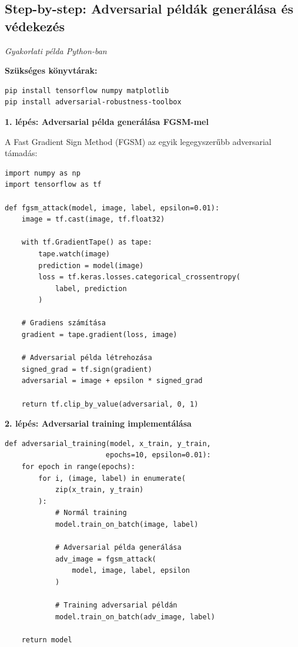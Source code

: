 \documentclass{../templates/magazine}
\begin{document}
\subsection{Step-by-step: Adversarial példák generálása és védekezés}

\textit{Gyakorlati példa Python-ban}

\textbf{Szükséges könyvtárak:}
\begin{verbatim}
pip install tensorflow numpy matplotlib
pip install adversarial-robustness-toolbox
\end{verbatim}

\textbf{1. lépés: Adversarial példa generálása FGSM-mel}

A Fast Gradient Sign Method (FGSM) az egyik legegyszerűbb adversarial támadás:

\begin{verbatim}
import numpy as np
import tensorflow as tf

def fgsm_attack(model, image, label, epsilon=0.01):
    image = tf.cast(image, tf.float32)

    with tf.GradientTape() as tape:
        tape.watch(image)
        prediction = model(image)
        loss = tf.keras.losses.categorical_crossentropy(
            label, prediction
        )

    # Gradiens számítása
    gradient = tape.gradient(loss, image)

    # Adversarial példa létrehozása
    signed_grad = tf.sign(gradient)
    adversarial = image + epsilon * signed_grad

    return tf.clip_by_value(adversarial, 0, 1)
\end{verbatim}

\textbf{2. lépés: Adversarial training implementálása}

\begin{verbatim}
def adversarial_training(model, x_train, y_train,
                        epochs=10, epsilon=0.01):
    for epoch in range(epochs):
        for i, (image, label) in enumerate(
            zip(x_train, y_train)
        ):
            # Normál training
            model.train_on_batch(image, label)

            # Adversarial példa generálása
            adv_image = fgsm_attack(
                model, image, label, epsilon
            )

            # Training adversarial példán
            model.train_on_batch(adv_image, label)

    return model
\end{verbatim}
\end{document}

